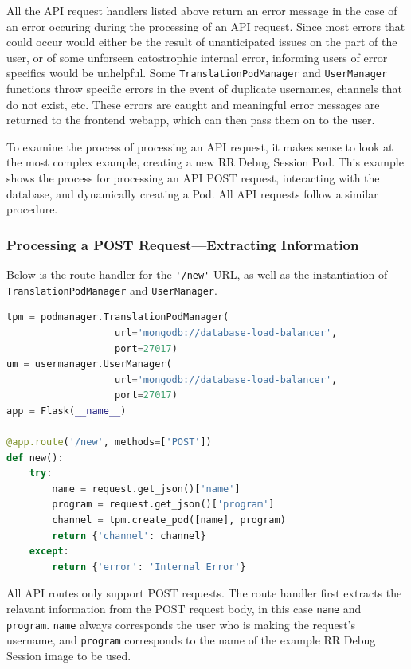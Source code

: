 \documentclass[12pt]{article}
\begin{document}
All the API request handlers listed above return an error message in
the case of an error occuring during the processing of an API request.
Since most errors that could occur would either be the result of
unanticipated issues on the part of the user, or of some unforseen
catostrophic internal error, informing users of error specifics would
be unhelpful.  Some \lstinline{TranslationPodManager} and
\lstinline{UserManager} functions throw specific errors in the event
of duplicate usernames, channels that do not exist, etc.  These errors
are caught and meaningful error messages are returned to the frontend
webapp, which can then pass them on to the user.
\par

To examine the process of processing an API request, it makes sense to
look at the most complex example, creating a new RR Debug Session Pod.
This example shows the process for processing an API POST request,
interacting with the database, and dynamically creating a Pod.  All
API requests follow a similar procedure.

\subsubsection{Processing a POST Request---Extracting Information}

Below is the route handler for the \lstinline{'/new'} URL, as well as
the instantiation of \lstinline{TranslationPodManager} and
\lstinline{UserManager}.

\begin{lstlisting}[language=Python,basicstyle=\linespread{0.5}\ttfamily,caption={API Server New RR Debug Session Event Handler},captionpos=b]
tpm = podmanager.TranslationPodManager(
                   url='mongodb://database-load-balancer',
                   port=27017)
um = usermanager.UserManager(
                   url='mongodb://database-load-balancer',
                   port=27017)
app = Flask(__name__)

@app.route('/new', methods=['POST'])
def new():
    try:
        name = request.get_json()['name']
        program = request.get_json()['program']
        channel = tpm.create_pod([name], program)
        return {'channel': channel}
    except:
        return {'error': 'Internal Error'}
\end{lstlisting}

All API routes only support POST requests.  The route handler first
extracts the relavant information from the POST request body, in this
case \lstinline{name} and \lstinline{program}.  \lstinline{name}
always corresponds the user who is making the request's username, and
\lstinline{program} corresponds to the name of the example RR Debug
Session image to be used.
\par
\end{document}
